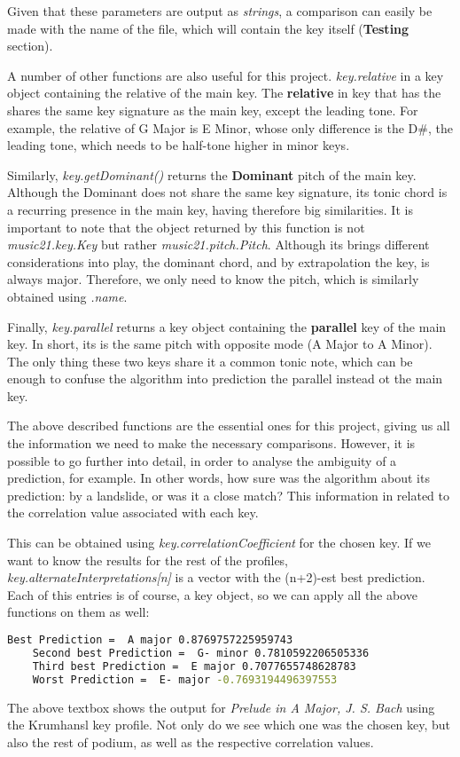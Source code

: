 Given that these parameters are output as \textit{strings}, a comparison can easily be made with the name of the file, which will contain the key itself (\textbf{Testing} section).

A number of other functions are also useful for this project.
\textit{key.relative} in a key object containing the relative of the main key. 
The \textbf{relative} in key that has the shares the same key signature as the main key, except the leading tone.
For example, the relative of G Major is E Minor, whose only difference is the D\#, the leading tone, which needs to be half-tone higher in minor keys.

Similarly, \textit{key.getDominant()} returns the \textbf{Dominant} pitch of the main key.
Although the Dominant does not share the same key signature, its tonic chord is a recurring presence in the main key, having therefore big similarities.
It is important to note that the object returned by this function is not \textit{music21.key.Key} but rather \textit{music21.pitch.Pitch}.
Although its brings different considerations into play, the dominant chord, and by extrapolation the key, is always major.
Therefore, we only need to know the pitch, which is similarly obtained using \textit{.name}.

Finally, \textit{key.parallel} returns a key object containing the \textbf{parallel} key of the main key. In short, its is the same pitch with opposite mode (A Major to A Minor).
The only thing these two keys share it a common tonic note, which can be enough to confuse the algorithm into prediction the parallel instead ot the main key.

The above described functions are the essential ones for this project, giving us all the information we need to make the necessary comparisons.
However, it is possible to go further into detail, in order to analyse the ambiguity of a prediction, for example.
In other words, how sure was the algorithm about its prediction: by a landslide, or was it a close match?
This information in related to the correlation value associated with each key.

This can be obtained using \textit{key.correlationCoefficient} for the chosen key.
If we want to know the results for the rest of the profiles, \textit{key.alternateInterpretations[n]} is a vector with the (n+2)-est best prediction.
Each of this entries is of course, a key object, so we can apply all the above functions on them as well:

\begin{lstlisting}[language=bash]
    Best Prediction =  A major 0.8769757225959743
    Second best Prediction =  G- minor 0.7810592206505336
    Third best Prediction =  E major 0.7077655748628783
    Worst Prediction =  E- major -0.7693194496397553
\end{lstlisting}

The above textbox shows the output for \textit{Prelude in A Major, J. S. Bach} using the Krumhansl key profile.
Not only do we see which one was the chosen key, but also the rest of podium, as well as the respective correlation values. 





